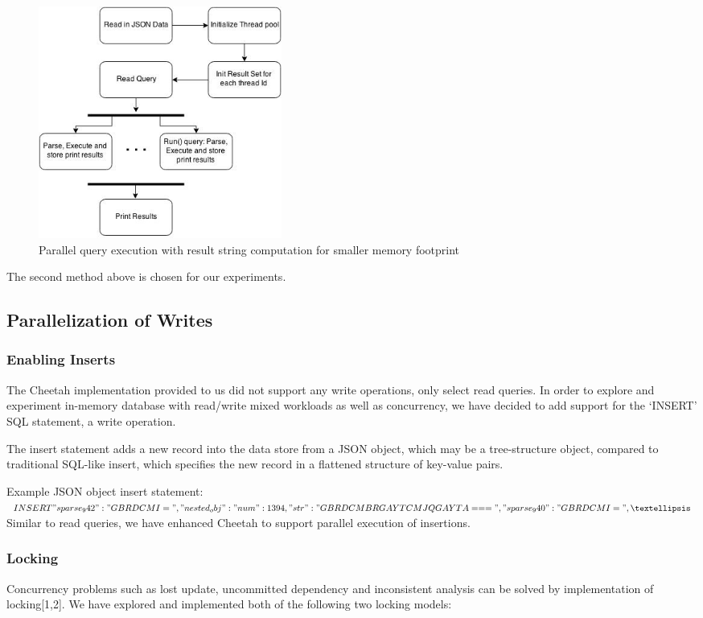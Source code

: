 \documentclass[11pt,journal,compsoc]{IEEEtran}
\begin{document}
\begin{figure}
\includegraphics[height=3in]{images/query_parallel}
\caption{Parallel query execution with result string computation for smaller memory footprint}
\label{fig_parallel_query}
\end{figure}

The second method above is chosen for our experiments.

\subsection{Parallelization of Writes}
\subsubsection{Enabling Inserts}


The Cheetah implementation provided to us did not support any write operations, only select read queries. In order to explore and experiment in-memory database with read/write mixed workloads as well as concurrency, we have decided to add support for the ‘INSERT’ SQL statement, a write operation.
 
The insert statement adds a new record into the data store from a JSON object, which may be a tree-structure object, compared to traditional SQL-like insert, which specifies the new record in a flattened structure of key-value pairs.

Example JSON object insert statement:
$
INSERT {"sparse_942": "GBRDCMI=", "nested_obj": {"num": 1394, "str": "GBRDCMBRGAYTCMJQGAYTA==="}, "sparse_940": "GBRDCMI=", …}
$
Similar to read queries, we have enhanced Cheetah to support parallel execution of insertions.



\subsubsection{Locking}
Concurrency problems such as lost update, uncommitted dependency and inconsistent analysis can be solved by implementation of locking[1,2]. We have explored and implemented both of the following two locking models:
 
\end{document}

